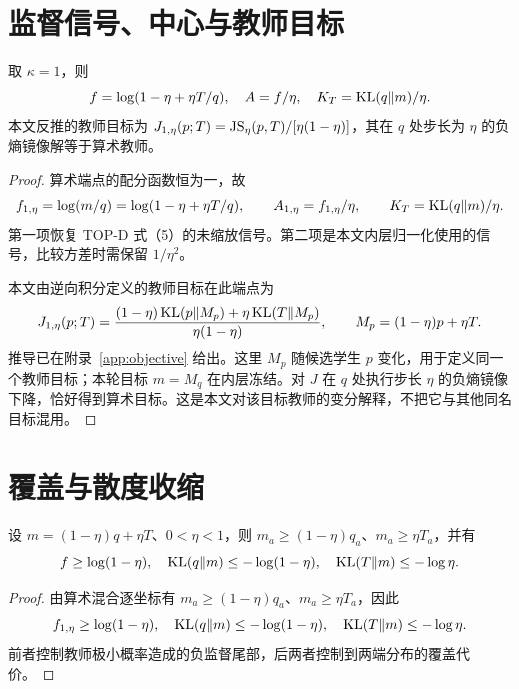 \section{监督信号、中心与教师目标}
\begin{proposition}
取 $\kappa=1$，则
\begin{equation}
f=\log(1-\eta+\eta T/q),\quad A=f/\eta,\quad K_T=\operatorname{KL}(q\Vert m)/\eta.
\end{equation}
本文反推的教师目标为 $J_{1,\eta}(p;T)=\operatorname{JS}_\eta(p,T)/[\eta(1-\eta)]$，其在 $q$ 处步长为 $\eta$ 的负熵镜像解等于算术教师。
\end{proposition}
\begin{proof}
算术端点的配分函数恒为一，故
\begin{equation}
f_{1,\eta}=\log(m/q)=\log(1-\eta+\eta T/q),\qquad
A_{1,\eta}=f_{1,\eta}/\eta,\qquad
K_T=\operatorname{KL}(q\Vert m)/\eta.
\label{eq:topd-signal}
\end{equation}
第一项恢复 TOP-D 式（5）的未缩放信号。第二项是本文内层归一化使用的信号，比较方差时需保留 $1/\eta^2$。

本文由逆向积分定义的教师目标在此端点为
\begin{equation}
J_{1,\eta}(p;T)=
\frac{(1-\eta)\operatorname{KL}(p\Vert M_p)+\eta\operatorname{KL}(T\Vert M_p)}
{\eta(1-\eta)},\qquad M_p=(1-\eta)p+\eta T.
\end{equation}
推导已在附录~\ref{app:objective} 给出。这里 $M_p$ 随候选学生 $p$ 变化，用于定义同一个教师目标；本轮目标 $m=M_q$ 在内层冻结。对 $J$ 在 $q$ 处执行步长 $\eta$ 的负熵镜像下降，恰好得到算术目标。这是本文对该目标教师的变分解释，不把它与其他同名目标混用。
\end{proof}

\section{覆盖与散度收缩}
\begin{proposition}[算术教师的覆盖与信号下界]
设 $m=(1-\eta)q+\eta T$、$0<\eta<1$，则 $m_a\ge(1-\eta)q_a$、$m_a\ge\eta T_a$，并有
\begin{equation}
f\ge\log(1-\eta),\quad
\operatorname{KL}(q\Vert m)\le-\log(1-\eta),\quad \operatorname{KL}(T\Vert m)\le-\log\eta.
\end{equation}
\end{proposition}
\begin{proof}
由算术混合逐坐标有 $m_a\ge(1-\eta)q_a$、$m_a\ge\eta T_a$，因此
\begin{equation}
f_{1,\eta}\ge\log(1-\eta),\quad
\operatorname{KL}(q\Vert m)\le-\log(1-\eta),\quad
\operatorname{KL}(T\Vert m)\le-\log\eta.
\end{equation}
前者控制教师极小概率造成的负监督尾部，后两者控制到两端分布的覆盖代价。
\end{proof}

